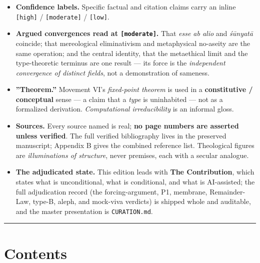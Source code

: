 \documentclass[11pt]{article}
\begin{document}
\begin{itemize}
\item \textbf{Confidence labels.} Specific factual and citation claims carry an inline \texttt{[high]} /\allowbreak{} \texttt{[moderate]} /\allowbreak{} \texttt{[low]}.
\item \textbf{Argued convergences read at \texttt{[moderate]}.} That \emph{esse ab alio} and \emph{śūnyatā} coincide; that mereological eliminativism and metaphysical no-aseity are the same operation; and the central identity, that the metaethical limit and the type-theoretic terminus are one result — its force is the \emph{independent convergence of distinct fields}, not a demonstration of sameness.
\item \textbf{''Theorem.''} Movement VI's \emph{fixed-point theorem} is used in a \textbf{constitutive /\allowbreak{} conceptual} sense — a claim that a \emph{type} is uninhabited — not as a formalized derivation. \emph{Computational irreducibility} is an informal gloss.
\item \textbf{Sources.} Every source named is real; \textbf{no page numbers are asserted unless verified}. The full verified bibliography lives in the preserved manuscript; Appendix B gives the combined reference list. Theological figures are \emph{illuminations of structure}, never premises, each with a secular analogue.
\item \textbf{The adjudicated state.} This edition leads with \textbf{The Contribution}, which states what is unconditional, what is conditional, and what is AI-assisted; the full adjudication record (the forcing-argument, P1, membrane, Remainder-Law, type-B, aleph, and mock-viva verdicts) is shipped whole and auditable, and the master presentation is \texttt{CURATION.md}.
\end{itemize}

\medskip\noindent\rule{\linewidth}{0.3pt}\medskip

\section*{Contents}
\end{document}
